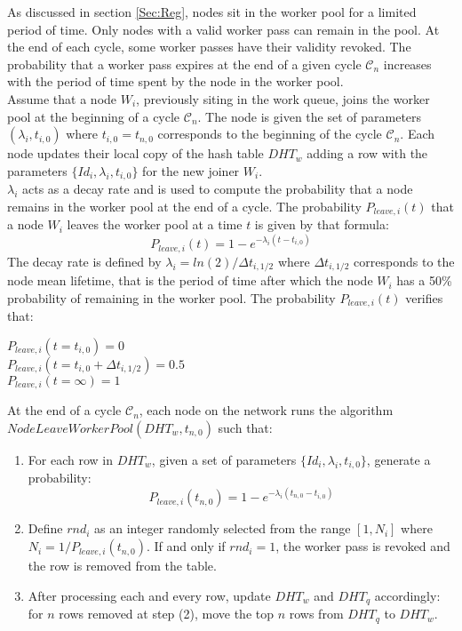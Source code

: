As discussed in section \ref{Sec:Reg}, nodes sit in the worker pool for a limited period of time. Only nodes with a valid worker pass can remain in the pool. At the end of each cycle, some worker passes have their validity revoked. The probability that a worker pass expires at the end of a given cycle $\mathcal{C}_n$ increases with the period of time spent by the node in the worker pool. \\

Assume that a node $W_i$, previously siting in the work queue, joins the worker pool at the beginning of a cycle $\mathcal{C}_n$. The node is given the set of parameters $(\lambda_i, t_{i,0})$ where $t_{i,0}=t_{n,0}$ corresponds to the beginning of the cycle $\mathcal{C}_n$. Each node updates their local copy of the hash table $DHT_w$ adding a row with the parameters $\{Id_i, \lambda_i, t_{i,0}\}$ for the new joiner $W_i$.\\

$\lambda_i$ acts as a decay rate and is used to compute the probability that a node remains in the worker pool at the end of a cycle. The probability $P_{leave,i}(t)$ that a node $W_i$ leaves the worker pool at a time $t$ is given by that formula:
\begin{equation}
P_{leave,i}(t) = 1 - e^{-\lambda_i(t-t_{i,0})}
\end{equation}
The decay rate is defined by $\lambda_i = ln(2)/\Delta t_{i,1/2}$ where $\Delta t_{i,1/2}$ corresponds to the node mean lifetime, that is the period of time after which the node $W_i$ has a 50\% probability of remaining in the worker pool. The probability $P_{leave,i}(t)$ verifies that:
\begin{flushleft}
\hspace{6cm}$P_{leave,i}(t = t_{i,0}) = 0$\\
\hspace{6cm}$P_{leave,i}(t = t_{i,0} + \Delta t_{i,1/2}) = 0.5$\\
\hspace{6cm}$P_{leave,i}(t = \infty) = 1$
\end{flushleft}
 
At the end of a cycle $\mathcal{C}_n$, each node on the network runs the algorithm\\ $NodeLeaveWorkerPool(DHT_w,t_{n,0})$ such that:
\begin{enumerate}
\item For each row in $DHT_w$, given a set of parameters $\{Id_i, \lambda_i, t_{i,0}\}$, generate a probability:
\begin{equation}
P_{leave,i}(t_{n,0}) = 1 - e^{-\lambda_i(t_{n,0}-t_{i,0})}
\end{equation}
\item Define $rnd_i$ as an integer randomly selected from the range $[1, N_i]$ where $N_i = 1/P_{leave,i}(t_{n,0})$. If and only if $rnd_i = 1$, the worker pass is revoked and the row is removed from the table.
\item After processing each and every row, update $DHT_w$ and $DHT_q$ accordingly: for $n$ rows removed at step (2), move the top $n$ rows from $DHT_q$ to $DHT_w$. 
\end{enumerate}
